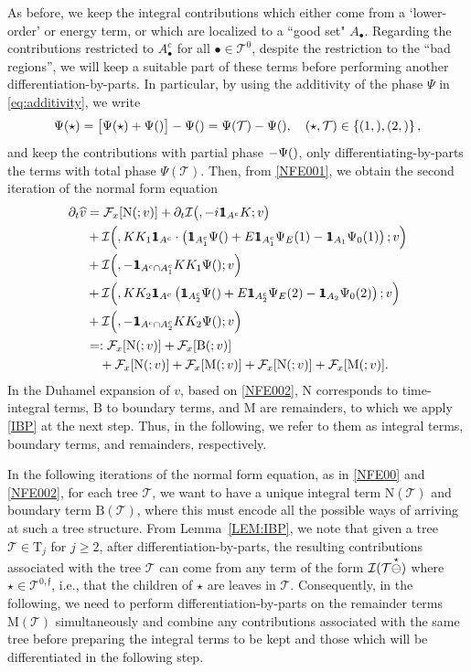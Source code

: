 \documentclass[a4paper,
11pt,  reqno]{amsart}
\makeatletter
\newcommand{\mathbbm}[1]{\mathchoice%
    {\hbox{\sffamily 1\kern-.40em 1}}%
    {\hbox{\sffamily 1\kern-.40em 1}}%
    {\hbox{\scriptsize\sffamily 1\kern-.30em 1}}%
    {\hbox{\tiny\sffamily 1\kern-.25em 1}}}%
\newcommand{\5}{\textup{V}}
\newcommand{\ft}{\widehat}
\newcommand{\ind}{\mathbbm 1}
\newcommand{\dt}{\partial_t}
\theoremstyle{remark}
\newcommand{\bul}{\bullet}
\newcommand{\TT}{\mathcal{T}}
\newcommand{\Tr}{\mathrm{T}}
\newcommand{\Ft}{{\mathcal{F}}}
\newcommand{\ff}{\mathfrak{f}}
\def\<#1>{\csname MH@symb@#1\endcsname}
\newcommand{\Ical}{\mathcal{I}}
\numberwithin{equation}{section}
\numberwithin{theorem}{section}
\newcommand{\MM}{\mathrm{M}}
\newcommand{\NN}{\mathrm{N}}
\newcommand{\BB}{\mathrm{B}}
\makeatother
\begin{document}
As before, we keep the integral contributions which either come from a `lower-order' or energy term, or which are localized to a ``good set" $A_\bul$. Regarding the contributions restricted to $A_\bul^c$ for all $\bul\in \TT^0$, despite the restriction to the ``bad regions'', we will keep a suitable part of these terms before performing another differentiation-by-parts. In particular, by using the additivity of the phase $\Psi$ in \eqref{eq:additivity}, we write
\begin{align}
\Psi(\star) 
= \big[ \Psi(\star) + \Psi(\<1>) \big]- \Psi(\<1>) 
=
\Psi(\TT) - \Psi(\<1>),
\quad (\star, \TT)\in \left\{ (1, \<21>) , (2, \<22>) \right\},
\end{align}
and keep the contributions with partial phase $-\Psi(\<1>)$, only differentiating-by-parts the terms with total phase $\Psi(\TT)$. Then, from \eqref{NFE001}, we obtain the second iteration of the normal form equation
\begin{align}
\dt\ft v
&
= 
 \Ft_x[ \NN ( \<1>; v )] 
+ 
\dt \Ical \big( \<1>, - i  \ind_{A^c} K; v \big)
\\
&
+
\Ical \Big( \<21>,  K K_1 \ind_{A^c} \cdot \left( \ind_{A_1^c} \Psi(\<1>) + E \ind_{A_1^c}  \Psi_E(1) - \ind_{A_1} \Psi_0(1) \right); v  \Big) 
\\
&
+
\Ical \Big( \<21>, - \ind_{A^c \cap A_1^c} KK_1\Psi(\<21>) ; v  \Big) 
\\
&
+
\Ical \Big( \<22>, KK_2 \ind_{A^c} \left( \ind_{A_2^c} \Psi(\<1>) + E \ind_{A_2^c} \Psi_E(2) - \ind_{A_2} \Psi_0(2)\right) ; v  \Big) 
\\
&
+
\Ical \Big( \<22>, - \ind_{A^c \cap A_2^c} KK_2\Psi(\<22>) ; v  \Big) 
\\
&
= : 
 \Ft_x[ \NN ( \<1>; v )]  
+ 
 \Ft_x[ 
\BB(\<1>;v)
] 
\\
&
\quad 
+ 
 \Ft_x[ 
\NN(\<21>; v )
] 
+
 \Ft_x[ 
\MM(\<21>; v )
] 
+
 \Ft_x[ 
\NN(\<22>; v)
]  
+
 \Ft_x[ 
\MM(\<22>;v)
]  
.
\label{NFE002}
\end{align}
In the Duhamel expansion of $v$, based on \eqref{NFE002}, $\NN$ corresponds to time-integral terms, $\BB$ to boundary terms, and $\MM$ are remainders, to which we apply \eqref{IBP} at the next step. Thus, in the following, we refer to them as integral terms, boundary terms, and remainders, respectively.



In the following iterations of the normal form equation, as in \eqref{NFE00} and \eqref{NFE002}, for each tree $\TT$, we want to have a unique integral term $\NN(\TT)$ and boundary term $\BB(\TT)$, 
where this must encode all the possible ways of arriving at such a tree structure. 
From Lemma~\ref{LEM:IBP}, we note that given a tree $\TT \in \Tr_j$ for $j\ge2$, after differentiation-by-parts, the resulting contributions associated with the tree $\TT$ can come from any term of the form $\Ical(\TT \overset{\star}{\ominus} \<1>)$ where $\star \in \TT^{0, \ff}$, i.e., that the children of $\star$ are leaves in $\TT$. Consequently, in the following, we need to perform differentiation-by-parts on the remainder terms $\MM(\TT)$ simultaneously and combine any contributions associated with the same tree before preparing the integral terms to be kept and those which will be differentiated in the following step. 
\end{document}
